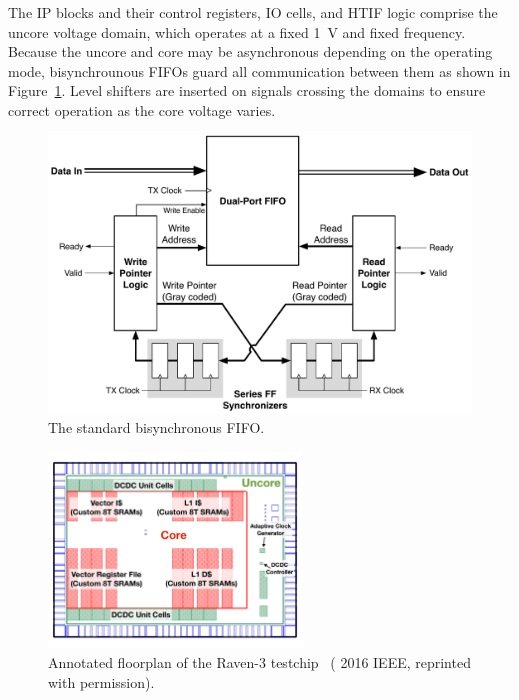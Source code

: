 \documentclass[graybox]{svmult}
\begin{document}
The IP blocks and their control registers, IO cells, and HTIF logic comprise the uncore voltage domain, which operates at a fixed \SI{1}{\volt} and fixed frequency.
Because the uncore and core may be asynchronous depending on the operating mode, bisynchrounous FIFOs guard all communication between them as shown in Figure~\ref{fig:5-bisync-fifo}.
Level shifters are inserted on signals crossing the domains to ensure correct operation as the core voltage varies.

\begin{figure}
  \centering
  \includegraphics[width=\textwidth]{5-bisync-fifo}
  \caption{The standard bisynchronous FIFO.}
  \label{fig:5-bisync-fifo}
\end{figure}

\begin{figure}
  \centering
  \includegraphics[width=0.6\textwidth]{6-raven3-floorplan}
  \caption{Annotated floorplan of the Raven-3 testchip~\cite{Zimmer2016} ({\textcopyright} 2016 IEEE, reprinted with permission).}
  \label{fig:6-raven3-floorplan}
\end{figure}
\end{document}

